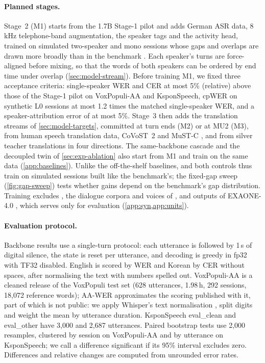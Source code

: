 \paragraph{Planned stages.}
Stage~2 (M1) starts from the 1.7B Stage-1 pilot and adds German ASR data, 8\,kHz telephone-band augmentation, the speaker tags and the activity head, trained on simulated two-speaker  and  mono sessions whose gaps and overlaps are drawn more broadly than in the benchmark \citep[cf.][]{landini2022from}. Each speaker's turns are force-aligned before mixing, so that the words of both speakers can be ordered by end time under overlap (\cref{sec:model-stream}). Before training M1, we fixed three acceptance criteria: single-speaker WER and CER at most 5\% (relative) above those of the Stage-1 pilot on VoxPopuli-AA and KsponSpeech, cpWER on synthetic L0 sessions at most 1.2 times the matched single-speaker WER, and a speaker-attribution error of at most 5\%. Stage~3 then adds the translation streams of \cref{sec:model-targets}, committed at turn ends (M2) or at MU2 (M3), from human  speech translation data, CoVoST~2 \citep{wang2021covost} and MuST-C \citep{digangi2019must}, and from silver teacher translations in four directions. The same-backbone cascade and the decoupled twin of \cref{sec:exp-ablation} also start from M1 and train on the same data (\cref{app:baselines}). Unlike the off-the-shelf baselines, \model and both controls thus train on simulated sessions built like the benchmark's; the fixed-gap sweep (\cref{fig:gap-sweep}) tests whether gains depend on the benchmark's gap distribution. Training excludes \taxi, the dialogue corpora and voices of \syn, and outputs of EXAONE-4.0 \citep{lgai2025exaone4}, which serves only for evaluation (\cref{app:syn,app:units}).

\paragraph{Evaluation protocol.}
Backbone results use a single-turn protocol: each utterance is followed by 1\,s of digital silence, the state is reset per utterance, and decoding is greedy in fp32 with TF32 disabled. English is scored by WER and Korean by CER without spaces, after normalising the text with numbers spelled out. VoxPopuli-AA is a cleaned release of the VoxPopuli test set \citep{wang2021voxpopuli} (628 utterances, 1.98\,h, 292 sessions, 18,072 reference words); AA-WER approximates the scoring published with it, part of which is not public: we apply Whisper's text normalisation \citep{radford2023robust}, split digits and weight the mean by utterance duration. KsponSpeech \citep{bang2020ksponspeech} eval\_clean and eval\_other have 3,000 and 2,687 utterances. Paired bootstrap tests use 2,000 resamples, clustered by session on VoxPopuli-AA and by utterance on KsponSpeech; we call a difference significant if its 95\% interval excludes zero. Differences and relative changes are computed from unrounded error rates.


